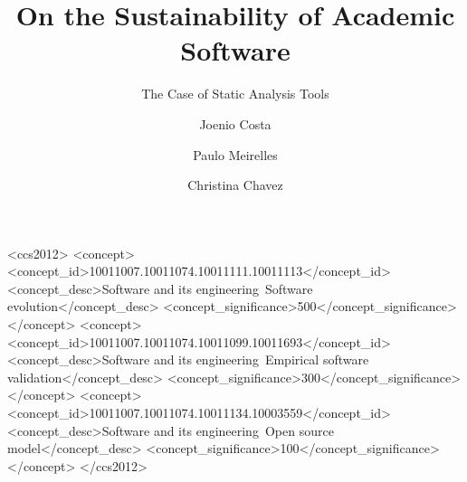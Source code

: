 \documentclass[sigconf]{acmart}
\begin{document}


\title{On the Sustainability of Academic Software}
\subtitle{The Case of Static Analysis Tools}

\author{Joenio Costa}

\author{Paulo Meirelles} 

\author{Christina Chavez}

\renewcommand{\shortauthors}{J. Costa et al.}

\begin{abstract}

\end{abstract}

%
%
\begin{CCSXML}
<ccs2012>
 <concept>
   <concept_id>10011007.10011074.10011111.10011113</concept_id>
   <concept_desc>Software and its engineering~Software evolution</concept_desc>
   <concept_significance>500</concept_significance>
 </concept>
 <concept>
   <concept_id>10011007.10011074.10011099.10011693</concept_id>
   <concept_desc>Software and its engineering~Empirical software validation</concept_desc>
   <concept_significance>300</concept_significance>
 </concept>
 <concept>
   <concept_id>10011007.10011074.10011134.10003559</concept_id>
   <concept_desc>Software and its engineering~Open source model</concept_desc>
   <concept_significance>100</concept_significance>
 </concept>
</ccs2012>
\end{CCSXML}



\maketitle


 

 


%



\end{document}
